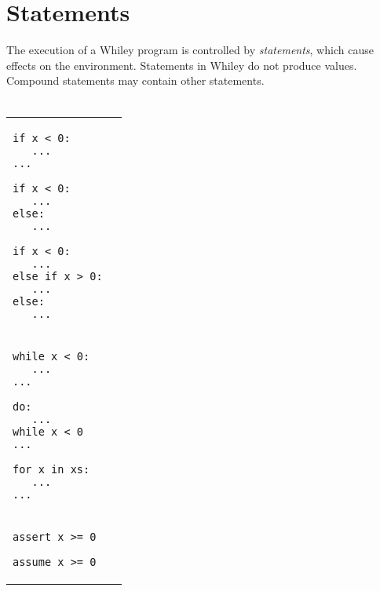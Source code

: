 \documentclass[a4paper,10pt,twcolumn]{article}
\begin{document}
\section*{Statements}
The execution of a Whiley program is controlled by {\em statements}, which cause effects on the environment.  Statements in Whiley do not produce values.  Compound statements may contain other statements.\\\\
\begin{tabular}{lr}
\begin{minipage}[t]{2cm}
\begin{lstlisting}
if x < 0:
   ...
...
\end{lstlisting}
\end{minipage} 
\hspace*{0.25cm}
\begin{minipage}[t]{2.25cm}
\begin{lstlisting}
if x < 0:
   ...
else:
   ...
\end{lstlisting}
\end{minipage}
\hspace*{0.25cm}
\begin{minipage}[t]{3cm}
\begin{lstlisting}
if x < 0:
   ...
else if x > 0:
   ...
else:
   ...
\end{lstlisting}
\end{minipage}\\
\begin{minipage}[t]{2.75cm}
\begin{lstlisting}
while x < 0:
   ...
...
\end{lstlisting}
\end{minipage}
\hspace*{0.2cm}
\begin{minipage}[t]{2.5cm}
\begin{lstlisting}
do:
   ...
while x < 0
...
\end{lstlisting}
\end{minipage}
\hspace*{0.2cm}
\begin{minipage}[t]{2.75cm}
\begin{lstlisting}
for x in xs:
   ...
...
\end{lstlisting}
\end{minipage}\\

\begin{minipage}[t]{3cm}
\begin{lstlisting}
assert x >= 0
\end{lstlisting}
\end{minipage}
\hspace*{0.25cm}
\begin{minipage}[t]{3cm}
\begin{lstlisting}
assume x >= 0
\end{lstlisting}
\end{minipage}
\\


\end{tabular}
\end{document}
